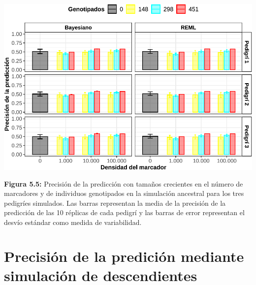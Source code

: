 \documentclass[11pt,spanish,a4paper,oneside,]{book} %
\begin{document}
\begin{center}\includegraphics[width=1\linewidth]{figures/Cor_Bay_Pen_2} \end{center}

\noindent
\textbf{Figura 5.5:} Precisión de la predicción con tamaños crecientes en el número de marcadores y de individuos genotipados en la simulación ancestral para los tres pedigríes simulados. Las barras representan la media de la precisión de la predicción de las 10 réplicas de cada pedigrí y las barras de error representan el desvío estándar como medida de variabilidad.

\hypertarget{precisiuxf3n-de-la-prediciuxf3n-mediante-simulaciuxf3n-de-descendientes-1}{%
\section{Precisión de la predición mediante simulación de descendientes}\label{precisiuxf3n-de-la-prediciuxf3n-mediante-simulaciuxf3n-de-descendientes-1}}
\end{document}

